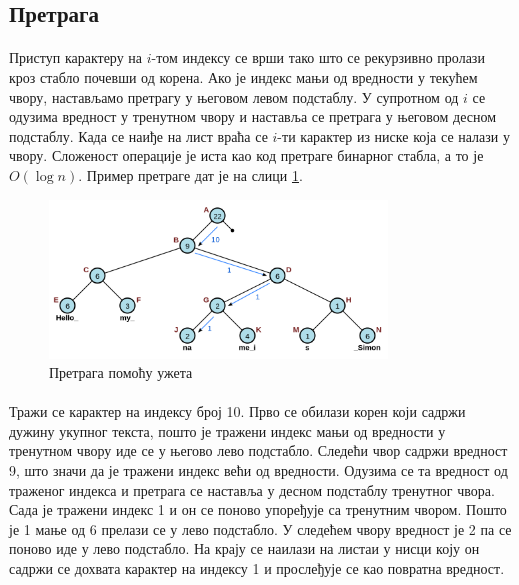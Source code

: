 \documentclass[12pt,oneside]{memoir}
\begin{document}
\subsection{Претрага}
\paragraph{}
Приступ карактеру на \(i\)-том  индексу се врши тако што се рекурзивно пролази кроз стабло 
почевши од корена. Ако је индекс мањи од вредности у текућем чвору, настављамо претрагу у његовом левом 
подстаблу. У супротном од \(i\) се одузима вредност у тренутном чвору и наставља се претрага у
његовом десном подстаблу. Када се наиђе на лист враћа се \(i\)-ти карактер из ниске која се налази
у чвору. Сложеност операције је иста као код претраге бинарног стабла, а то је \(O(\log{}n)\).
Пример претраге дат је на слици \ref{fig:rope_search}.

\begin{figure}
  \centering
  \includegraphics[width=0.8\textwidth]{images/rope_search.png}
  \caption{Претрага помоћу ужета}
  \label{fig:rope_search}
\end{figure}

\paragraph{}
Тражи се карактер на индексу број 10. Прво се обилази корен који садржи дужину укупног текста, 
пошто је тражени индекс мањи од вредности у тренутном чвору иде се у његово лево подстабло. Следећи чвор
садржи вредност 9, што значи да је тражени индекс већи од вредности. Одузима се та вредност од траженог
индекса и претрага се наставља у десном подстаблу тренутног чвора. Сада је тражени индекс 1 и он се
поново упоређује са тренутним чвором. Пошто је 1 мање од 6 прелази се у лево подстабло. 
У следећем чвору вредност је 2 па се поново иде у лево подстабло. 
На крају се наилази на листаи у нисци коју он садржи се дохвата карактер на индексу 1 
и прослеђује се као повратна вредност.
\end{document}
